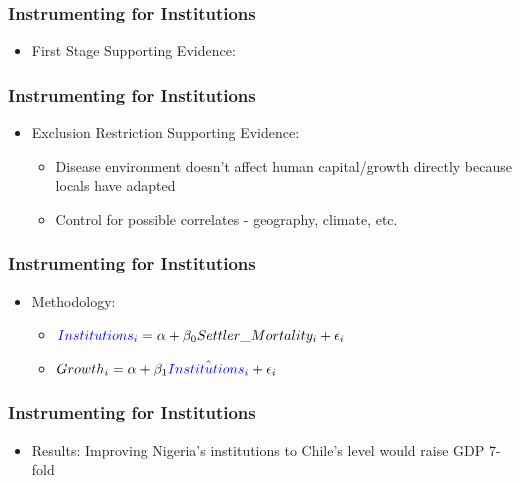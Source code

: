 \documentclass[xcolor=x11names,compress]{beamer}\usepackage[]{graphicx}\usepackage[]{color}
\renewcommand{\(}{\begin{columns}}
\renewcommand{\)}{\end{columns}}
\newcommand{\<}[1]{\begin{column}{#1}}
\renewcommand{\>}{\end{column}}
\begin{document}

\begin{frame}
\frametitle{Instrumenting for Institutions}
\begin{itemize}
\item First Stage Supporting Evidence:
\end{itemize}
\end{frame}

\begin{frame}
\frametitle{Instrumenting for Institutions}
\begin{itemize}
\item Exclusion Restriction Supporting Evidence:
\begin{itemize}
\item Disease environment doesn't affect human capital/growth directly because locals have adapted
\pause
\item Control for possible correlates - geography, climate, etc.
\end{itemize}
\end{itemize}
\end{frame}

\begin{frame}
\frametitle{Instrumenting for Institutions}
\begin{itemize}
\item Methodology:
\begin{itemize}
\item ${\color{blue}Institutions_i} = \alpha + \beta_0 Settler\_Mortality_i + \epsilon_i$
\item $Growth_i = \alpha + \beta_1 {\color{blue}\hat{Institutions_i}} + \epsilon_i$
\end{itemize}
\end{itemize}
\end{frame}

\begin{frame}
\frametitle{Instrumenting for Institutions}
\begin{itemize}
\item Results: Improving Nigeria's institutions to Chile's level would raise GDP 7-fold
\end{itemize}
\end{frame}
\end{document}
